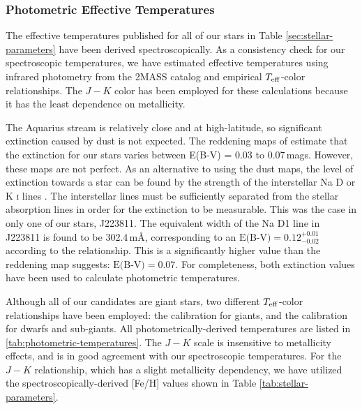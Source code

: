 \documentclass{emulateapj}
\begin{document}
\subsubsection{Photometric Effective Temperatures}
\label{sec:photometric-temperatures}

The effective temperatures published for all of our stars in Table \ref{sec:stellar-parameters} have been derived spectroscopically. As a consistency check for our spectroscopic temperatures, we have estimated effective temperatures using infrared photometry from the 2MASS catalog and empirical $T_{\rm eff}$-color relationships. The $J-K$ color has been employed for these calculations because it has the least dependence on metallicity. 

The Aquarius stream is relatively close and at high-latitude, so significant extinction caused by dust is not expected. The reddening maps of \citet{schlegel;et-al_1998} estimate that the extinction for our stars varies between E(B-V) = 0.03 to 0.07\,mags. However, these maps are not perfect. As an alternative to using the \citet{schlegel;et-al_1998} dust maps, the level of extinction towards a star can be found by the strength of the interstellar Na D or K \textsc{i} lines \citep{munari;zwitter_1997}. The interstellar lines must be sufficiently separated from the stellar absorption lines in order for the extinction to be measurable. This was the case in only one of our stars, J223811. The equivalent width of the Na D1 line in J223811 is found to be 302.4\,m{\AA}, corresponding to an $\mbox{E(B-V)} = 0.12^{+0.01}_{-0.02}$ according to the \citet{munari;zwitter_1997} relationship. This is a significantly higher value than the \citet{schlegel;et-al_1998} reddening map suggests: $\mbox{E(B-V)} = 0.07$. For completeness, both extinction values have been used to calculate photometric temperatures. 

Although all of our candidates are giant stars, two different $T_{\rm eff}$-color relationships have been employed: the \citet{alonso;et-al_1999} calibration for giants, and the \citet{casagrande;et-al_2010} calibration for dwarfs and sub-giants. All photometrically-derived temperatures are listed in \ref{tab:photometric-temperatures}. The \citet{alonso;et-al_1999} $J-K$ scale is insensitive to metallicity effects, and is in good agreement with our spectroscopic temperatures. For the \citet{casagrande;et-al_2010} $J-K$ relationship, which has a slight metallicity dependency, we have utilized the spectroscopically-derived [Fe/H] values shown in Table \ref{tab:stellar-parameters}.
\end{document}
